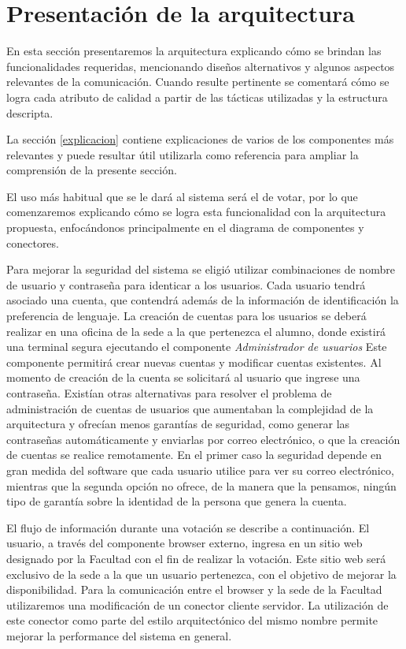 \section{Presentación de la arquitectura}

En esta sección presentaremos la arquitectura explicando cómo se brindan las funcionalidades requeridas, mencionando diseños alternativos y algunos aspectos relevantes de la comunicación. Cuando resulte pertinente se comentará cómo se logra cada atributo de calidad a partir de las tácticas utilizadas y la estructura descripta. 


La sección \ref{explicacion} contiene explicaciones de varios de los componentes más relevantes y puede resultar útil utilizarla como referencia para ampliar la comprensión de la presente sección.


El uso más habitual que se le dará al sistema será el de votar, por lo que comenzaremos explicando cómo se logra esta funcionalidad con la arquitectura propuesta, enfocándonos principalmente en el diagrama de componentes y conectores.


Para mejorar la seguridad del sistema se eligió utilizar combinaciones de nombre de usuario y contraseña para identicar a los usuarios. Cada usuario tendrá asociado una cuenta, que contendrá además de la información de identificación la preferencia de lenguaje. La creación de cuentas para los usuarios se deberá realizar en una oficina de la sede a la que pertenezca el alumno, donde existirá una terminal segura ejecutando el componente \emph{Administrador de usuarios} Este componente permitirá crear nuevas cuentas y modificar cuentas existentes. Al momento de creación de la cuenta se solicitará al usuario que ingrese una contraseña. Existían otras alternativas para resolver el problema de administración de cuentas de usuarios que aumentaban la complejidad de la arquitectura y ofrecían menos garantías de seguridad, como generar las contraseñas automáticamente y enviarlas por correo electrónico, o que la creación de cuentas se realice remotamente. En el primer caso la seguridad depende en gran medida del software que cada usuario utilice para ver su correo electrónico, mientras que la segunda opción no ofrece, de la manera que la pensamos, ningún tipo de garantía sobre la identidad de la persona que genera la cuenta.

El flujo de información durante una votación se describe a continuación. El usuario, a través del componente browser externo, ingresa en un sitio web designado por la Facultad con el fin de realizar la votación.  Este sitio web será exclusivo de la sede a la que un usuario pertenezca, con el objetivo de mejorar la disponibilidad. Para la comunicación entre el browser y la sede de la Facultad utilizaremos una modificación de un conector cliente servidor. La utilización de este conector como parte del estilo arquitectónico del mismo nombre permite mejorar la performance del sistema en general.


